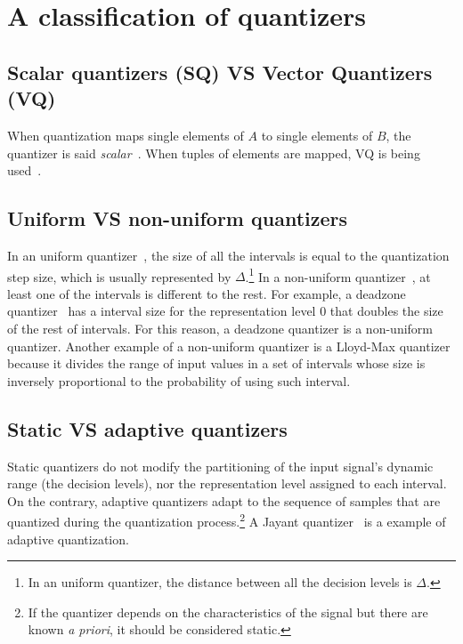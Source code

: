 \section{A classification of quantizers}

\subsection{Scalar quantizers (SQ) VS Vector Quantizers (VQ)}

When quantization maps single elements of $A$ to single elements of
$B$, the quantizer is said
\emph{scalar}~\cite{vruiz__scalar_quantization}. When tuples of
elements are mapped, VQ is being
used~\cite{vruiz__vector_quantization}.

\subsection{Uniform VS non-uniform quantizers}

In an uniform quantizer~\cite{vruiz__scalar_quantization}, the size of
all the intervals is equal to the quantization step size, which is
usually represented by $\Delta$.\footnote{In an uniform quantizer, the
distance between all the decision levels is $\Delta$.} In a
non-uniform quantizer~\cite{vruiz__scalar_quantization}, at least one
of the intervals is different to the rest. For example, a deadzone
quantizer~\cite{vruiz__scalar_quantization} has a interval size for
the representation level 0 that doubles the size of the rest of
intervals. For this reason, a deadzone quantizer is a non-uniform
quantizer. Another example of a non-uniform quantizer is a Lloyd-Max
quantizer because it divides the range of input values in a set of
intervals whose size is inversely proportional to the probability of
using such interval.

\subsection{Static VS adaptive quantizers}

Static quantizers do not modify the partitioning of the input signal's
dynamic range (the decision levels), nor the representation level
assigned to each interval. On the contrary, adaptive quantizers adapt
to the sequence of samples that are quantized during the quantization
process.\footnote{If the quantizer depends on the characteristics of
the signal but there are known \emph{a priori}, it should be
considered static.} A Jayant
quantizer~\cite{vruiz__scalar_quantization} is a example of adaptive
quantization.

